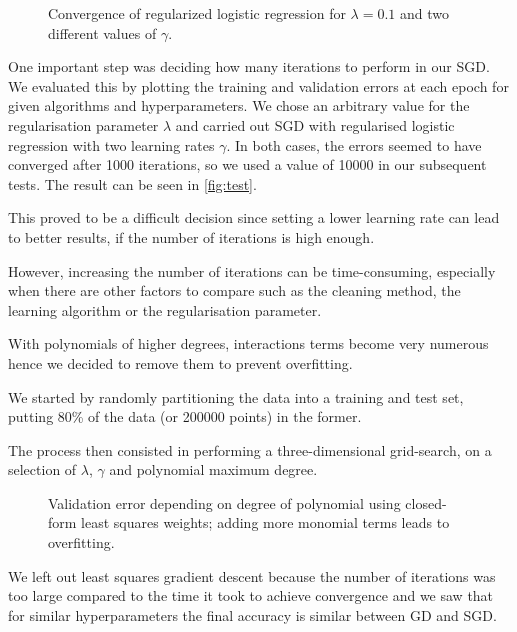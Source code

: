 \documentclass[10pt,conference,compsocconf]{IEEEtran}
\begin{document}
\begin{figure}
  \centering
  
  \vspace{-3mm}
  \caption{Convergence of regularized logistic regression for $\lambda = 0.1$ and two
  different values of $\gamma$.}
  \label{fig:test}
\end{figure}


One important step was deciding how many iterations to perform in our
SGD. We evaluated this by plotting the training and validation errors
at each epoch for given algorithms and hyperparameters.
We chose an arbitrary value for the regularisation parameter $\lambda$ and carried out SGD with regularised logistic regression with two learning rates $\gamma$.
In both cases, the errors seemed to have converged after 1000 iterations, so we used a value of 10000 in our subsequent tests.
The result can
be seen in \autoref{fig:test}.

This proved to be a difficult decision since setting a lower learning rate can lead to better results,
if the number of iterations is high enough.

However, increasing the number of iterations can be
time-consuming, especially when there are other
factors to compare such as the cleaning method, the learning algorithm or 
the regularisation parameter.


With polynomials of higher degrees, interactions terms become very numerous hence we decided to remove them
to prevent overfitting.


We started by randomly partitioning the data into a training and test set,
putting 80\% of the data (or 200000 points) in the former.

The process then consisted in performing a three-dimensional grid-search, on a selection of $\lambda$, $\gamma$ and polynomial maximum degree.


\begin{figure}
  \centering
  
  \vspace{-3mm}
  \caption{Validation error depending on degree of polynomial using closed-form least squares weights; adding more monomial terms leads to overfitting.}
  \label{fig:overfitting}
\end{figure}

We left out least squares gradient descent because the number of iterations was too large compared to the time it took to achieve convergence and we saw that for similar hyperparameters the final accuracy is similar between GD and SGD.
\end{document}
